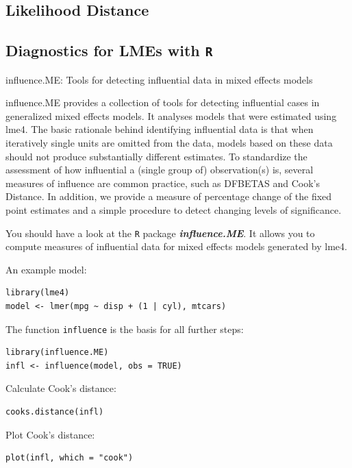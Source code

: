 \documentclass[12pt, a4paper]{article}
\theoremstyle{plain}
\theoremstyle{definition}
\theoremstyle{remark}
\begin{document}




\subsection{Likelihood Distance}


\citet{BA83}

\subsection{Diagnostics for LMEs with \texttt{R}}
influence.ME: Tools for detecting influential data in mixed effects models

influence.ME provides a collection of tools for detecting influential cases in generalized mixed effects models. It analyses models that were estimated using lme4. The basic rationale behind identifying influential data is that when iteratively single units are omitted from the data, models based on these data should not produce substantially different estimates. To standardize the assessment of how influential a (single group of) observation(s) is, several measures of influence are common practice, such as DFBETAS and Cook's Distance. In addition, we provide a measure of percentage change of the fixed point estimates and a simple procedure to detect changing levels of significance.



You should have a look at the \texttt{R} package \textit{\textbf{influence.ME}}. It allows you to compute measures of influential data for mixed effects models generated by lme4.

An example model:
\begin{verbatim}
library(lme4)
model <- lmer(mpg ~ disp + (1 | cyl), mtcars)
\end{verbatim}

The function \texttt{influence} is the basis for all further steps:

\begin{verbatim}
library(influence.ME)
infl <- influence(model, obs = TRUE)
\end{verbatim}
Calculate Cook's distance:
\begin{verbatim}
cooks.distance(infl)
\end{verbatim}
Plot Cook's distance:
\begin{verbatim}
plot(infl, which = "cook")
\end{verbatim}
\newpage
\end{document}
